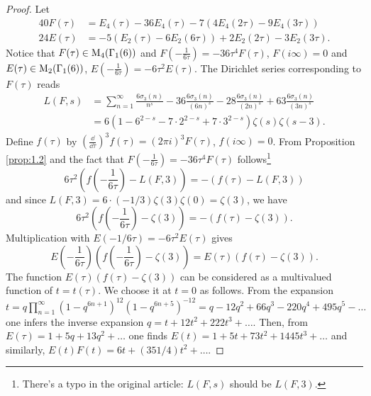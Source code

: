 \begin{proof}
    Let
    \begin{align*}
        40 F(\tau) &= E_4(\tau) - 36 E_4(\tau) - 7 (4E_4(2\tau) - 9E_4(3\tau)) \\
        24 E(\tau) &= -5(E_2(\tau) - 6E_2(6\tau)) + 2E_2(2\tau) - 3E_2(3\tau).
    \end{align*}
    Notice that $F(\tau) \in \mathrm{M}_4(\Gamma_1(6))$ and $F(-\frac{1}{6\tau}) = -36 \tau^4 F(\tau)$, $F(i\infty) = 0$ and $E(\tau) \in \mathrm{M}_2(\Gamma_1(6))$, $E(-\frac{1}{6\tau}) =  - 6\tau^2 E(\tau)$.
    The Dirichlet series corresponding to $F(\tau)$ reads
    \begin{align*}
        L(F, s) &= \sum_{n=1}^{\infty} \frac{6\sigma_3(n)}{n^s} - 36 \frac{6 \sigma_3(n)}{(6n)^s} - 28 \frac{6 \sigma_3(n)}{(2n)^s} + 63 \frac{6 \sigma_3(n)}{(3n)^s} \\
        &= 6(1 - 6^{2-s} - 7 \cdot 2^{2-s} + 7 \cdot 3^{2-s}) \zeta(s) \zeta(s - 3).
    \end{align*}
    Define $f(\tau)$ by $(\frac{\dd}{\dd \tau})^{3} f(\tau) = (2 \pi i )^{3} F(\tau)$, $f(i \infty) = 0$.
    From Proposition \ref{prop:1.2} and the fact that $F(-\frac{1}{6\tau}) = -36 \tau^4 F(\tau)$ follows\footnote{There's a typo in the original article: $L(F, s)$ should be $L(F, 3)$.}
    $$
        6 \tau^2 \left(f\left(-\frac{1}{6\tau}\right) - L(F, 3)\right) = -(f(\tau) - L(F, 3))
    $$
    and since $L(F, 3) = 6 \cdot (-1/3) \zeta(3) \zeta(0) = \zeta(3)$, we have
    $$
        6 \tau^2 \left(f\left(-\frac{1}{6\tau}\right) - \zeta(3)\right) = -(f(\tau) - \zeta(3)).
    $$
    Multiplication with $E(-1/6\tau) = -6\tau^2 E(\tau)$ gives
    \begin{equation}
        \label{eqn:2}
        E\left(-\frac{1}{6\tau}\right) \left(f\left(-\frac{1}{6 \tau}\right) - \zeta(3)\right) = E(\tau) (f(\tau) - \zeta(3)).
    \end{equation}
    The function $E(\tau)(f(\tau) - \zeta(3))$ can be considered as a multivalued function of $t = t(\tau)$.
    We choose it at $t = 0$ as follows.
    From the expansion $t = q\prod_{n=1}^{\infty} (1 - q^{6n + 1})^{12} (1 - q^{6n + 5})^{-12} = q - 12q^2 + 66q^3 - 220q^4 + 495 q^5 - \dots$ one infers the inverse expansion $q = t + 12 t^2 + 222 t^3 + \dots$.
    Then, from $E(\tau) = 1 + 5q + 13 q^2 + \dots$ one finds $E(t) = 1 + 5t + 73 t^2 + 1445 t^3 + \dots$ and similarly, $E(t) F(t) = 6t + (351/4)t^2 + \dots$.


\end{proof}
